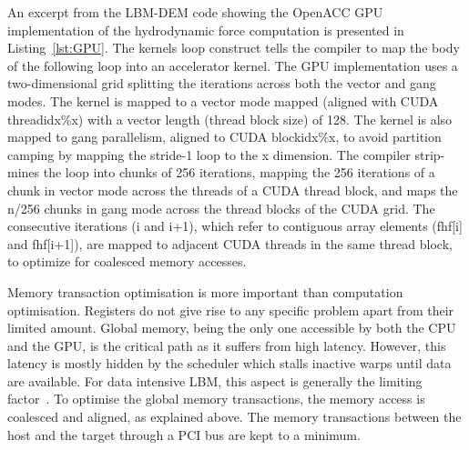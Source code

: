 An excerpt from the LBM-DEM code showing the OpenACC GPU implementation of the 
hydrodynamic force computation is presented in Listing~\ref{lst:GPU}. The 
kernels loop construct tells the compiler to map the body of the following loop 
into an accelerator kernel. The GPU implementation uses a two-dimensional grid 
splitting the iterations across both the vector and gang modes. The kernel is 
mapped to a vector mode mapped (aligned with CUDA threadidx\%x) with a vector 
length (thread block size) of 128. The kernel is also mapped to gang 
parallelism, aligned to CUDA blockidx\%x, to avoid partition camping by mapping 
the stride-1 loop to the x dimension. The compiler strip-mines the loop into 
chunks of 256 iterations, mapping the 256 iterations of a chunk in vector mode 
across the threads of a CUDA thread block, and maps the n/256 chunks in gang 
mode across the thread blocks of the CUDA grid. The consecutive iterations (i 
and i+1), which refer to contiguous array elements (fhf[i] and fhf[i+1]), are 
mapped to adjacent CUDA threads in the same thread block, to optimize for 
coalesced memory accesses. 

Memory transaction optimisation is more important than computation
optimisation. Registers do not give rise to any specific problem apart from 
their limited amount. Global memory, being the only one accessible by both the 
CPU and the GPU, is the critical path as it suffers from high latency. However, 
this latency is mostly hidden by the scheduler which stalls inactive warps 
until data are available. For data intensive LBM, this aspect is generally the 
limiting factor~\citep{Obrecht2011}. To optimise the global memory 
transactions, the memory access is coalesced and aligned, as explained above. 
The memory transactions between the host and the target through a PCI bus are 
kept to a minimum.

\clearpage

